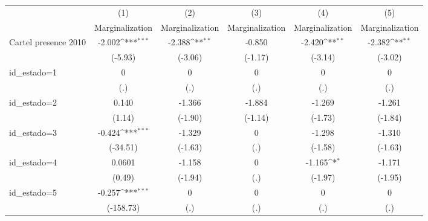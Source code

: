 {
\def\sym#1{\ifmmode^{#1}\else\(^{#1}\)\fi}
\begin{tabular}{l*{5}{c}}
\hline\hline
                    &\multicolumn{1}{c}{(1)}&\multicolumn{1}{c}{(2)}&\multicolumn{1}{c}{(3)}&\multicolumn{1}{c}{(4)}&\multicolumn{1}{c}{(5)}\\
                    &\multicolumn{1}{c}{Marginalization}&\multicolumn{1}{c}{Marginalization}&\multicolumn{1}{c}{Marginalization}&\multicolumn{1}{c}{Marginalization}&\multicolumn{1}{c}{Marginalization}\\
\hline
Cartel presence 2010&      -2.002\sym{***}&      -2.388\sym{**} &      -0.850         &      -2.420\sym{**} &      -2.382\sym{**} \\
                    &     (-5.93)         &     (-3.06)         &     (-1.17)         &     (-3.14)         &     (-3.02)         \\
[1em]
id\_estado=1         &           0         &           0         &           0         &           0         &           0         \\
                    &         (.)         &         (.)         &         (.)         &         (.)         &         (.)         \\
[1em]
id\_estado=2         &       0.140         &      -1.366         &      -1.884         &      -1.269         &      -1.261         \\
                    &      (1.14)         &     (-1.90)         &     (-1.14)         &     (-1.73)         &     (-1.84)         \\
[1em]
id\_estado=3         &      -0.424\sym{***}&      -1.329         &           0         &      -1.298         &      -1.310         \\
                    &    (-34.51)         &     (-1.63)         &         (.)         &     (-1.58)         &     (-1.63)         \\
[1em]
id\_estado=4         &      0.0601         &      -1.158         &           0         &      -1.165\sym{*}  &      -1.171         \\
                    &      (0.49)         &     (-1.94)         &         (.)         &     (-1.97)         &     (-1.95)         \\
[1em]
id\_estado=5         &      -0.257\sym{***}&           0         &           0         &           0         &           0         \\
                    &   (-158.73)         &         (.)         &         (.)         &         (.)         &         (.)         \\

\end{tabular}}
